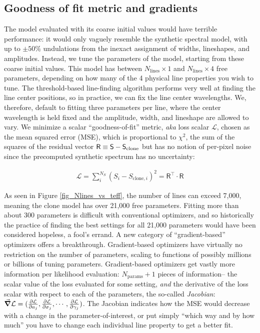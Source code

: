 \documentclass[twocolumn]{aastex631}
\begin{document}
\subsection{Goodness of fit metric and gradients}
The model evaluated with its coarse initial values would have terrible performance: it would only vaguely resemble the synthetic spectral model, with up to $\pm 50\%$ undulations from the inexact assignment of widths, lineshapes, and amplitudes. Instead, we tune the parameters of the model, starting from these coarse initial values. This model has between $N_{\mathrm{lines}}\times 1$ and $N_{\mathrm{lines}}\times 4$ free parameters, depending on how many of the 4 physical line properties you wish to tune.  The threshold-based line-finding algorithm performs very well at finding the line center positions, so in practice, we can fix the line center wavelengths.  We, therefore, default to fitting three parameters per line, where the center wavelength is held fixed and the amplitude, width, and lineshape are allowed to vary. We minimize a scalar ``goodness-of-fit'' metric, \emph{aka} loss scalar $\mathcal{L}$, chosen as the mean squared error (MSE), which is proportional to $\chi^2$, the sum of the squares of the residual vector $\mathsf{R} \equiv \mathsf{S}-\mathsf{S}_{\rm clone}$ but has no notion of per-pixel noise since the precomputed synthetic spectrum has no uncertainty:

\begin{eqnarray}
    \mathcal{L} = \sum_i^{N_S} (S_i - S_{\mathrm{clone},i})^2 = \mathsf{R^\intercal}\cdot \mathsf{R} \label{simpleLikelihood}
\end{eqnarray}


As seen in Figure \ref{fig_Nlines_vs_teff}, the number of lines can exceed 7,000, meaning the clone model has over 21,000 free parameters. Fitting more than about 300 parameters is difficult with conventional optimizers, and so historically the practice of finding the best settings for all 21,000 parameters would have been considered hopeless, a fool's errand.  A new category of ``gradient-based'' optimizers offers a breakthrough.  Gradient-based optimizers have virtually no restriction on the number of parameters, scaling to functions of possibly millions or billions of tuning parameters.  Gradient-based optimizers get vastly more information per likelihood evaluation: $N_\mathrm{params}+1$ pieces of information-- the scalar value of the loss evaluated for some setting, \emph{and} the derivative of the loss scalar with respect to each of the parameters, the so-called \emph{Jacobian}: $\grad \mathcal{L} = (\frac{\partial \mathcal{L}}{\partial a_j}, \frac{\partial \mathcal{L}}{\partial \sigma_j}, \cdots, \frac{\partial \mathcal{L}}{\partial \gamma_j})$.  The Jacobian indicates how the MSE would decrease with a change in the parameter-of-interest, or put simply ``which way and by how much'' you have to change each individual line property to get a better fit.
\end{document}
